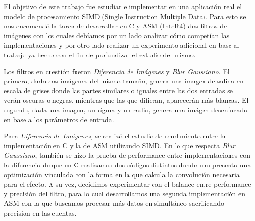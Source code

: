 El objetivo de este trabajo fue estudiar e implementar en una aplicación real el
modelo de procesamiento SIMD (Single Instruction Multiple Data). Para esto se
nos encomendó la tarea de desarrollar en C y ASM (Intel64) dos filtros de
imágenes con los cuales debíamos por un lado analizar cómo competían las
implementaciones y por otro lado realizar un experimento adicional en base al
trabajo ya hecho con el fin de profundizar el estudio del mismo.

Los filtros en cuestión fueron \textit{Diferencia de Imágenes} y \textit{Blur
Gaussiano}. El primero, dado dos imágenes del mismo tamaño, genera una imagen de salida
en escala de grises donde las partes similares o iguales entre las dos entradas
se verán oscuras o negras, mientras que las que difieran, aparecerán más
blancas. El segundo, dada una imagen, un sigma y un radio, genera una imágen
desenfocada en base a los parámetros de entrada.

Para \textit{Diferencia de Imágenes}, se realizó el estudio de rendimiento entre
la implementación en C y la de ASM utilizando SIMD. En lo que respecta
\textit{Blur Gaussiano}, también se hizo la prueba de performance entre
implementaciones con la diferencia de que en C realizamos dos códigos distintos
donde uno presenta una optimización vinculada con la forma en la que calcula
la convolución necesaria para el efecto. A su vez, decidimos experimentar con el
balance entre performance y precisión del filtro, para lo cual desarrollamos
una segunda implementación en ASM con la que buscamos procesar más datos en
simultáneo sacrificando precisión en las cuentas.
